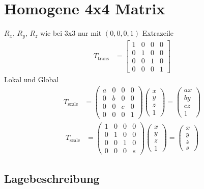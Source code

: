\section{Homogene 4x4 Matrix}
$R_x$, $R_y$, $R_z$ wie bei 3x3 nur mit $(0,0,0,1)$ Extrazeile
\begin{align}
    T_{\text{trans}} &= \begin{bmatrix}1 & 0 & 0 & 0\\0 & 1 & 0 & 0\\0 & 0 & 1 & 0\\0 & 0 & 0 & 1\end{bmatrix}
\end{align}
Lokal und Global
\begin{align}
    T_{\text{scale}} &= \begin{pmatrix}a & 0 & 0 & 0\\0 & b & 0 & 0\\
    0 & 0 & c & 0\\0 & 0 & 0 & 1\end{pmatrix} \begin{pmatrix}x\\y\\z\\1\end{pmatrix} = \begin{pmatrix}ax\\by\\cz\\1\end{pmatrix}
\end{align}
\begin{align}
    T_{\text{scale}} &= \begin{pmatrix}1 & 0 & 0 & 0\\0 & 1 & 0 & 0\\
    0 & 0 & 1 & 0\\0 & 0 & 0 & s\end{pmatrix} \begin{pmatrix}x\\y\\z\\1\end{pmatrix} = \begin{pmatrix}x\\y\\z\\s\end{pmatrix}
\end{align}
\subsection{Lagebeschreibung}

